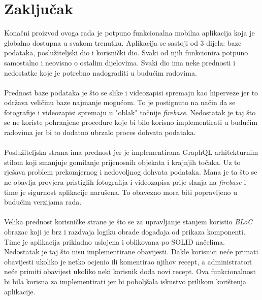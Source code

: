 \documentclass[times, utf8, zavrsni]{fer}
\begin{document}
\chapter{Zaključak}
Konačni proizvod ovoga rada je potpuno funkcionalna mobilna aplikacija koja je globalno dostupna u svakom trenutku.
Aplikacija se sastoji od 3 dijela: baze podataka, poslužiteljski dio i korisnički dio. Svaki od njih funkcionira potpuno
samostalno i neovisno o ostalim dijelovima. Svaki dio ima neke prednosti i nedostatke koje je potrebno
nadograditi u budućim radovima.
\\\\
Prednost baze podataka je što se slike i videozapisi spremaju kao hiperveze
jer to održava veličinu baze najmanje mogućom. To je postignuto na način da se fotografije i videozapisi
spremaju u "oblak" točnije \textit{firebase}. Nedostatak
je taj što se ne koriste pohranjene procedure koje bi bilo korisno implementirati
u budućim radovima jer bi to dodatno ubrzalo proces dohvata podataka.
\\\\
Poslužiteljska strana ima prednost jer je implementirana GraphQL
arhitekturnim stilom koji smanjuje gomilanje prijenosnih objekata i krajnjih točaka. Uz to rješava problem
prekomjernog i nedovoljnog dohvata podataka.
Mana je ta što se ne obavlja provjera pristiglih fotografija i videozapisa prije slanja na \textit{firebase} i time
je sigurnost aplikacije narušena. To obavezno mora biti popravljeno u budućim verzijama rada.
\\\\
Velika prednost korisničke strane je što se za upravljanje stanjem koristio
\textit{BLoC} obrazac koji je brz i razdvaja logiku obrade događaja od prikaza komponenti.
Time je aplikacija prikladno uslojena i oblikovana po SOLID načelima. Nedostatak je taj što nisu implementirane
obavijesti. Dakle korisnici neće primati obavijesti ukoliko je netko ocjenio ili komentirao njihov recept, a administratori neće
primiti obavijest ukoliko neki korisnik doda novi recept. Ova funkcionalnost bi bila korisna za implementirati
jer bi poboljšala iskustvo prilikom korištenja aplikacije.



\nocite{ProgramiranjeUJavi}
\nocite{GraphQL}
\nocite{Authentication}
\nocite{Spring}
\nocite{bloc}
\end{document}
